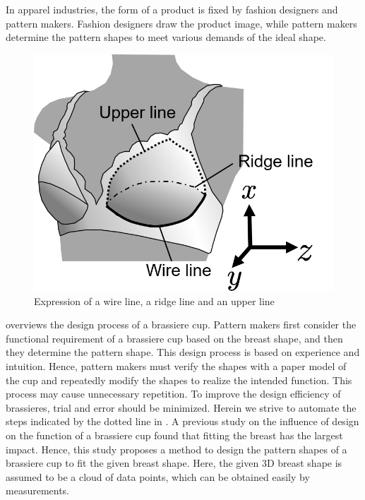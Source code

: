 \documentclass[E]{scitrans}
\begin{document}
In apparel industries, the form of a product is fixed by fashion designers and pattern makers. Fashion designers draw the product image, while pattern makers determine the pattern shapes to meet various demands of the ideal shape.
\begin{figure}[h!]
	\centering
	\includegraphics[scale=0.25]{./figure/Lines.png}
	\caption{Expression of a wire line, a ridge line and an upper line}
	\label{fig:TwoCurves}
\end{figure}
 overviews the design process of a brassiere cup. Pattern makers first consider the functional requirement of a brassiere cup based on the breast shape, and then they determine the pattern shape. This design process is based on experience and intuition. Hence, pattern makers must verify the shapes with a paper model of the cup and repeatedly modify the shapes to realize the intended function. This process may cause unnecessary repetition. To improve the design efficiency of brassieres, trial and error should be minimized. Herein we strive to automate the steps indicated by the dotted line in . 
A previous study on the influence of design on the function of a brassiere cup found that fitting the breast has the largest impact\cite{c1}. Hence, this study proposes a method to design the pattern shapes of a brassiere cup to fit the given breast shape. Here, the given 3D breast shape is assumed to be a cloud of data points, which can be obtained easily by measurements.
\end{document}
